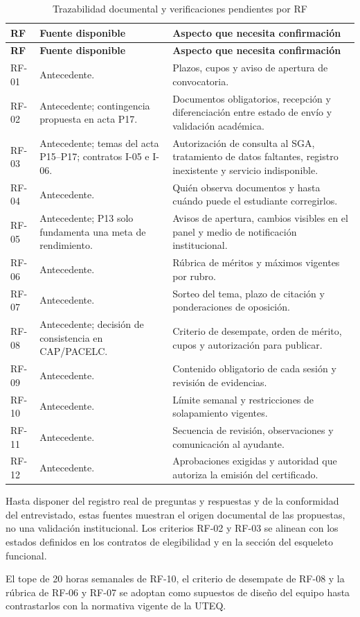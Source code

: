 \begingroup\small
\begin{longtable}{@{}p{}p{}p{}@{}}
\caption{Trazabilidad documental y verificaciones pendientes por RF}\label{tab:rf-fuentes}\\
\toprule
\textbf{RF} & \textbf{Fuente disponible} & \textbf{Aspecto que necesita confirmación}\\
\midrule\endfirsthead
\toprule
\textbf{RF} & \textbf{Fuente disponible} & \textbf{Aspecto que necesita confirmación}\\
\midrule\endhead
\bottomrule\endfoot
RF-01 & Antecedente. & Plazos, cupos y aviso de apertura de convocatoria.\\
RF-02 & Antecedente; contingencia propuesta en acta P17. & Documentos obligatorios, recepción y diferenciación entre estado de envío y validación académica.\\
RF-03 & Antecedente; temas del acta P15--P17; contratos I-05 e I-06. & Autorización de consulta al SGA, tratamiento de datos faltantes, registro inexistente y servicio indisponible.\\
RF-04 & Antecedente. & Quién observa documentos y hasta cuándo puede el estudiante corregirlos.\\
RF-05 & Antecedente; P13 solo fundamenta una meta de rendimiento. & Avisos de apertura, cambios visibles en el panel y medio de notificación institucional.\\
RF-06 & Antecedente. & Rúbrica de méritos y máximos vigentes por rubro.\\
RF-07 & Antecedente. & Sorteo del tema, plazo de citación y ponderaciones de oposición.\\
RF-08 & Antecedente; decisión de consistencia en CAP/PACELC. & Criterio de desempate, orden de mérito, cupos y autorización para publicar.\\
RF-09 & Antecedente. & Contenido obligatorio de cada sesión y revisión de evidencias.\\
RF-10 & Antecedente. & Límite semanal y restricciones de solapamiento vigentes.\\
RF-11 & Antecedente. & Secuencia de revisión, observaciones y comunicación al ayudante.\\
RF-12 & Antecedente. & Aprobaciones exigidas y autoridad que autoriza la emisión del certificado.\\
\end{longtable}
\endgroup

Hasta disponer del registro real de preguntas y respuestas y de la conformidad del entrevistado, estas fuentes muestran el origen documental de las propuestas, no una validación institucional. Los criterios RF-02 y RF-03 se alinean con los estados definidos en los contratos de elegibilidad y en la sección del esqueleto funcional.

El tope de 20 horas semanales de RF-10, el criterio de desempate de RF-08 y la rúbrica de RF-06 y RF-07 se adoptan como supuestos de diseño del equipo hasta contrastarlos con la normativa vigente de la UTEQ.
